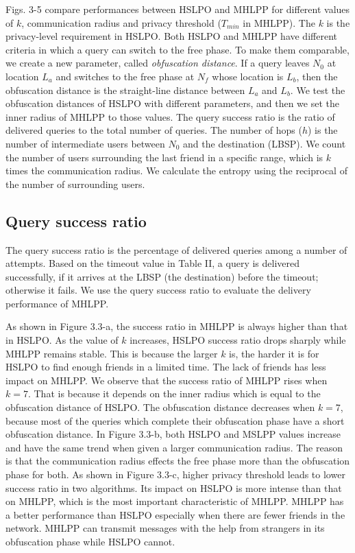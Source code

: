 \noindent Figs. 3-5 compare performances between HSLPO and MHLPP for different values of $k$, communication radius and privacy threshold (${T}_{min}$ in MHLPP). The $k$ is the privacy-level requirement in HSLPO. Both HSLPO and MHLPP have different criteria in which a query can switch to the free phase. To make them comparable, we create a new parameter, called \textit{obfuscation distance}. If a query leaves ${N}_{0}$ at location ${L}_{a}$ and switches to the free phase at ${N}_{f}$ whose location is ${L}_{b}$, then the obfuscation distance is the straight-line distance between ${L}_{a}$ and ${L}_{b}$. We test the obfuscation distances of HSLPO with different parameters, and then we set the inner radius of MHLPP to those values. The query success ratio is the ratio of delivered queries to the total number of queries. The number of hops ($h$) is the number of intermediate users between ${N}_{0}$ and the destination (LBSP). We count the number of users surrounding the last friend in a specific range, which is $k$ times the communication radius. We calculate the entropy using the reciprocal of the number of surrounding users.

\subsection{ Query success ratio}

\noindent The query success ratio is the percentage of delivered queries among a number of attempts. Based on the timeout value in Table II, a query is delivered successfully, if it arrives at the LBSP (the destination) before the timeout; otherwise it fails. We use the query success ratio to evaluate the delivery performance of MHLPP.


\noindent As shown in Figure 3.3-a, the success ratio in MHLPP is always higher than that in HSLPO. As the value of $k$ increases, HSLPO success ratio drops sharply while MHLPP remains stable. This is because the larger $k$ is, the harder it is for HSLPO to find enough friends in a limited time. The lack of friends has less impact on MHLPP. We observe that the success ratio of MHLPP rises when $k=7$. That is because it depends on the inner radius which is equal to the obfuscation distance of HSLPO. The obfuscation distance decreases when $k=7$, because most of the queries which complete their obfuscation phase have a short obfuscation distance. In Figure 3.3-b, both HSLPO and MSLPP values increase and have the same trend when given a larger communication radius. The reason is that the communication radius effects the free phase more than the obfuscation phase for both. As shown in Figure 3.3-c, higher privacy threshold leads to lower success ratio in two algorithms. Its impact on HSLPO is more intense than that on MHLPP, which is the most important characteristic of MHLPP. MHLPP has a better performance than HSLPO especially when there are fewer friends in the network. MHLPP can transmit messages with the help from strangers in its obfuscation phase while HSLPO cannot. 


